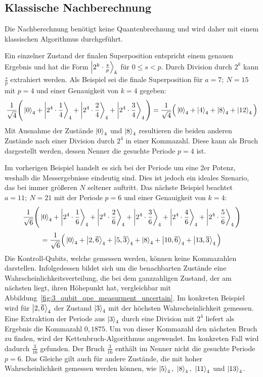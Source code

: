 \subsection{Klassische Nachberechnung} \label{Funktionsweise:klassisch}
Die Nachberechnung benötigt keine Quantenbrechnung und 
wird daher mit einem klassischen Algorithmus durchgeführt.

Ein einzelner Zustand der finalen Superposition 
entspricht einem genauen Ergebnis und hat die Form \(\ket{2^k \cdot \frac{s}{p}}_k\) für \(0 \leq s < p\).
Durch Division durch \(2^k\) kann \(\frac{s}{p}\) extrahiert werden.
Als Beispiel sei die finale Superposition für \(a = 7;~N=15\) mit \(p=4\) und einer Genauigkeit von \(k=4\) gegeben:
\[\frac{1}{\sqrt{4}}
\Bigg(\ket{0}_4 +\ket{2^4 \cdot \frac{1}{4}}_4 + \ket{2^4 \cdot \frac{2}{4}}_4+\ket{2^4 \cdot \frac{3}{4}}_4
\Bigg) =
 \frac{1}{\sqrt{4}}
 \Big(\ket{0}_4 +\ket{4}_4 + \ket{8}_4+\ket{12}_4\Big) \]
Mit Ausnahme der Zustände \(\ket{0}_4\) und \(\ket{8}_4\) 
resultieren die beiden anderen Zustände nach einer Division durch \(2^4\) in einer Kommazahl. 
Diese kann als Bruch dargestellt werden, 
dessen Nenner die gesuchte Periode \(p=4\) ist.

Im vorherigen Beispiel handelt es sich bei der Periode um eine 2er Potenz, 
weshalb die Messergebnisse eindeutig sind.
Dies ist jedoch ein ideales Szenario, 
das bei immer größeren \(N\) seltener auftritt. 
Das nächste Beispiel beachtet \(a=11;~N=21\) mit der Periode \(p=6\) und einer Genauigkeit von \(k=4\):
\[\frac{1}{\sqrt{6}}
\Bigg(\ket{0}_4 +\ket{2^4 \cdot \frac{1}{6}}_4 + \ket{2^4 \cdot \frac{2}{6}}_4+
\ket{2^4 \cdot \frac{3}{6}}_4+\ket{2^4 \cdot \frac{4}{6}}_4 + \ket{2^4 \cdot \frac{5}{6}}_4
\Bigg) \]
\[= \frac{1}{\sqrt{6}}
\Big(\ket{0}_4 +\ket{2,\overline{6}}_4 + \ket{5,\overline{3}}_4+
\ket{8}_4+\ket{10,\overline{6}}_4 + \ket{13,\overline{3}}_4
\Big) \]
Die Kontroll-Qubits, welche gemessen werden, 
können keine Kommazahlen darstellen.
Infolgedessen bildet sich um die benachbarten Zustände eine Wahrscheinlichkeitsverteilung, 
die bei dem ganzzahligen Zustand, der am nächsten liegt, 
ihren Höhepunkt hat, vergleichbar mit Abbildung~\ref{fig:3_qubit_qpe_measurment_uncertain}.
Im konkreten Beispiel wird für \(\ket{2,\overline{6}}_4\) der Zustand \(\ket{3}_4\) 
mit der höchsten Wahrscheinlichkeit gemessen.
Eine Extraktion der Periode aus \(\ket{3}_4\) durch eine Division mit \(2^4\) liefert als Ergebnis die Kommazahl \(0,1875\).
Um von dieser Kommazahl den nächsten Bruch zu finden, wird der Kettenbruch-Algorithmus angewendet.
Im konkreten Fall wird dadurch \(\frac{3}{16}\) gefunden.
Der Bruch \(\frac{3}{16}\) enthält im Nenner nicht die gesuchte Periode \(p=6\). 
Das Gleiche gilt auch für andere Zustände, 
die mit hoher Wahrscheinlichkeit gemessen werden können, wie 
\(\ket{5}_4,~\ket{8}_4,~\ket{11}_4\) und \(\ket{13}_4\).

